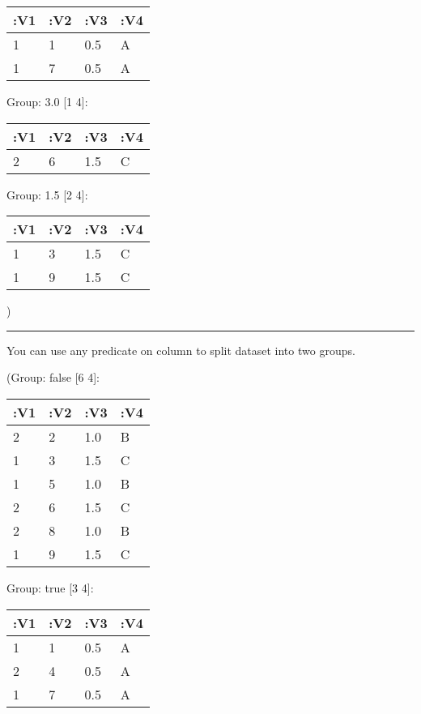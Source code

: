 \documentclass[]{article}
\newenvironment{Shaded}{\begin{snugshade}}{\end{snugshade}}
\newcommand{\AttributeTok}[1]{\textcolor[rgb]{0.77,0.63,0.00}{#1}}
\newcommand{\FloatTok}[1]{\textcolor[rgb]{0.00,0.00,0.81}{#1}}
\newcommand{\KeywordTok}[1]{\textcolor[rgb]{0.13,0.29,0.53}{\textbf{#1}}}
\newcommand{\NormalTok}[1]{#1}
\newcommand{\VariableTok}[1]{\textcolor[rgb]{0.00,0.00,0.00}{#1}}
\begin{document}
\begin{longtable}[]{@{}llll@{}}
\toprule
:V1 & :V2 & :V3 & :V4\tabularnewline
\midrule
\endhead
1 & 1 & 0.5 & A\tabularnewline
1 & 7 & 0.5 & A\tabularnewline
\bottomrule
\end{longtable}

Group: 3.0 {[}1 4{]}:

\begin{longtable}[]{@{}llll@{}}
\toprule
:V1 & :V2 & :V3 & :V4\tabularnewline
\midrule
\endhead
2 & 6 & 1.5 & C\tabularnewline
\bottomrule
\end{longtable}

Group: 1.5 {[}2 4{]}:

\begin{longtable}[]{@{}llll@{}}
\toprule
:V1 & :V2 & :V3 & :V4\tabularnewline
\midrule
\endhead
1 & 3 & 1.5 & C\tabularnewline
1 & 9 & 1.5 & C\tabularnewline
\bottomrule
\end{longtable}

)

\begin{center}\rule{0.5\linewidth}{0.5pt}\end{center}

You can use any predicate on column to split dataset into two groups.

\begin{Shaded}
\end{Shaded}

(Group: false {[}6 4{]}:

\begin{longtable}[]{@{}llll@{}}
\toprule
:V1 & :V2 & :V3 & :V4\tabularnewline
\midrule
\endhead
2 & 2 & 1.0 & B\tabularnewline
1 & 3 & 1.5 & C\tabularnewline
1 & 5 & 1.0 & B\tabularnewline
2 & 6 & 1.5 & C\tabularnewline
2 & 8 & 1.0 & B\tabularnewline
1 & 9 & 1.5 & C\tabularnewline
\bottomrule
\end{longtable}

Group: true {[}3 4{]}:

\begin{longtable}[]{@{}llll@{}}
\toprule
:V1 & :V2 & :V3 & :V4\tabularnewline
\midrule
\endhead
1 & 1 & 0.5 & A\tabularnewline
2 & 4 & 0.5 & A\tabularnewline
1 & 7 & 0.5 & A\tabularnewline
\bottomrule
\end{longtable}
\end{document}
